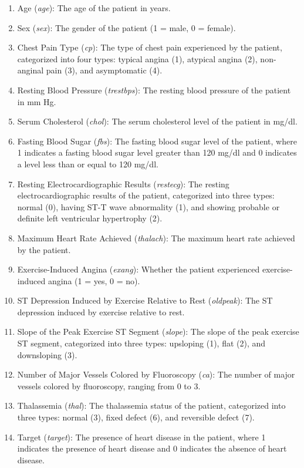 \begin{enumerate}
    \item Age (\textit{age}): The age of the patient in years.
    \item Sex (\textit{sex}): The gender of the patient (1 = male, 0 = female).
    \item Chest Pain Type (\textit{cp}): The type of chest pain experienced by the patient, categorized into four types: typical angina (1), atypical angina (2), non-anginal pain (3), and asymptomatic (4).
    \item Resting Blood Pressure (\textit{trestbps}): The resting blood pressure of the patient in mm Hg.
    \item Serum Cholesterol (\textit{chol}): The serum cholesterol level of the patient in mg/dl.
    \item Fasting Blood Sugar (\textit{fbs}): The fasting blood sugar level of the patient, where 1 indicates a fasting blood sugar level greater than 120 mg/dl and 0 indicates a level less than or equal to 120 mg/dl.
    \item Resting Electrocardiographic Results (\textit{restecg}): The resting electrocardiographic results of the patient, categorized into three types: normal (0), having ST-T wave abnormality (1), and showing probable or definite left ventricular hypertrophy (2).
    \item Maximum Heart Rate Achieved (\textit{thalach}): The maximum heart rate achieved by the patient.
    \item Exercise-Induced Angina (\textit{exang}): Whether the patient experienced exercise-induced angina (1 = yes, 0 = no).
    \item ST Depression Induced by Exercise Relative to Rest (\textit{oldpeak}): The ST depression induced by exercise relative to rest.
    \item Slope of the Peak Exercise ST Segment (\textit{slope}): The slope of the peak exercise ST segment, categorized into three types: upsloping (1), flat (2), and downsloping (3).
    \item Number of Major Vessels Colored by Fluoroscopy (\textit{ca}): The number of major vessels colored by fluoroscopy, ranging from 0 to 3.
    \item Thalassemia (\textit{thal}): The thalassemia status of the patient, categorized into three types: normal (3), fixed defect (6), and reversible defect (7).
    \item Target (\textit{target}): The presence of heart disease in the patient, where 1 indicates the presence of heart disease and 0 indicates the absence of heart disease.
\end{enumerate}
